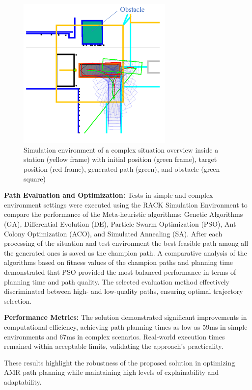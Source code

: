 \documentclass{amam}                %
\begin{document}
\begin{figure}[t]
  \centering \includegraphics[width=3in]{obstacle_complicated.png}
  \caption{Simulation environment of a complex situation overview inside a station (yellow frame) with initial position (green frame), target position (red frame), generated path (green), and obstacle (green square) }
  \label{obstacle}
\end{figure}

\noindent \textbf{Path Evaluation and Optimization:} 
Tests in simple and complex environment settings were executed using the 
RACK Simulation Environment to compare the performance of the Meta-heuristic algorithms: Genetic Algorithms (GA), Differential Evolution (DE), Particle Swarm Optimization (PSO), Ant Colony Optimization (ACO), and Simulated Annealing (SA). After each processing of the situation and test environment the best feasible path among all the generated ones is saved as the champion path. 
A comparative analysis of the algorithms based on fitness values of the champion paths and planning time demonstrated that PSO provided the most balanced performance in terms of planning time and path quality. The selected evaluation method effectively discriminated between high- and low-quality paths, ensuring optimal trajectory selection.  

\noindent \textbf{Performance Metrics:} The solution demonstrated significant improvements in computational efficiency, achieving path planning times as low as 59ms in simple environments and 67ms in complex scenarios. Real-world execution times remained within acceptable limits, validating the approach’s practicality.

These results highlight the robustness of the proposed solution in optimizing AMR path planning while maintaining high levels of explainability and adaptability.
\end{document}
